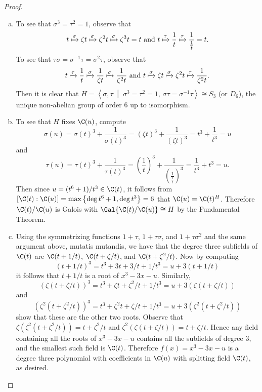 \documentclass[10pt]{amsart}
\begin{document}
\begin{thm}
  \begin{proof}
    \begin{enumerate}[(a)]
    \item
      To see that $\sigma^3 = \tau^2 = 1$, observe that 
      $$t \xmapsto{\sigma} \zeta t \xmapsto{\sigma} \zeta^2t \xmapsto{\sigma} \zeta^3 t = t\ \text{and}\ t \xmapsto{\tau} \frac{1}{t} \xmapsto{\tau} \frac{1}{\frac{1}{t}} = t.$$
      To see that $\tau\sigma = \sigma^{-1}\tau = \sigma^2\tau$, observe that
      $$t \xmapsto{\tau} \frac{1}{t} \xmapsto{\sigma} \frac{1}{\zeta t} \xmapsto{\sigma} \frac{1}{\zeta^2t}\ \text{and}\ t \xmapsto{\sigma} \zeta t \xmapsto{\sigma} \zeta^2t \xmapsto{\tau} \frac{1}{\zeta^2t}.$$
      Then it is clear that $H = \left< \sigma, \tau \;\middle\vert\; \sigma^3 = \tau^2 = 1,\, \sigma \tau = \sigma^{-1}\tau \right> \cong S_3$ (or $D_6$), the unique non-abelian group of order 6 up to isomorphism.
    \item
      To see that $H$ fixes $\C(u)$, compute
      $$\sigma(u) = \sigma(t)^3 + \frac{1}{\sigma(t)^3} = (\zeta t)^3 + \frac{1}{(\zeta t)^3} = t^3 + \frac{1}{t^3} = u$$
      and
      $$\tau(u) = \tau(t)^3 + \frac{1}{\tau(t)^3} = \left(\frac{1}{t}\right)^3 + \frac{1}{\left(\frac{1}{\frac{1}{t}}\right)^3} = \frac{1}{t^3} + {t^3} = u.$$
      Then since $u = (t^6 + 1)/t^3 \in \C(t)$, it follows from $[\C(t) : \C(u)] = \max\left\{\deg{t^6 + 1}, \deg{t^3}\right\} = 6$ that $\C(u) = \C(t)^H$.
      Therefore $\C(t)/\C(u)$ is Galois with $\Gal{\C(t)/\C(u)} \cong H$ by the Fundamental Theorem.
    \item
      Using the symmetrizing functions $1 + \tau$, $1 + \tau\sigma$, and $1 + \tau\sigma^2$ and the same argument above, mutatis mutandis, we have that the degree three subfields of $\C(t)$ are $\C(t + 1/t)$, $\C(t + \zeta/t)$, and $\C(t + \zeta^2/t)$.
      Now by computing 
      $$(t + 1/t)^3 = t^3 + 3t + 3/t + 1/t^3 = u + 3(t + 1/t)$$
      it follows that $t + 1/t$ is a root of $x^3 - 3x - u$.
      Similarly, 
      $$(\zeta(t + \zeta/t))^3 = t^3 + \zeta t + \zeta^2/t + 1/t^3 = u + 3(\zeta(t + \zeta/t))$$
      and
      $$(\zeta^2(t + \zeta^2/t))^3 = t^3 + \zeta^2 t + \zeta/t + 1/t^3 = u + 3(\zeta^2(t + \zeta^2/t))$$
      show that these are the other two roots.
      Observe that $\zeta(\zeta^2(t + \zeta^2/t)) = t + \zeta^2/t$ and $\zeta^2(\zeta(t + \zeta/t)) = t + \zeta/t$.
      Hence any field containing all the roots of $x^3 - 3x - u$ contains all the subfields of degree 3, and the smallest such field is $\C(t)$.
      Therefore $f(x) = x^3 - 3x - u$ is a degree three polynomial with coefficients in $\C(u)$ with splitting field $\C(t)$, as desired.
    \end{enumerate}
  \end{proof}
\end{thm}
\end{document}
